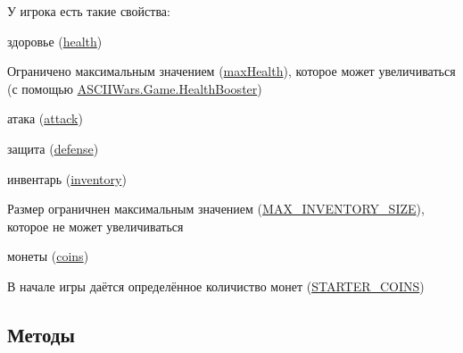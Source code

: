 У игрока есть такие свойства\+:
\begin{DoxyItemize}
\item здоровье (\hyperlink{class_a_s_c_i_i_wars_1_1_game_1_1_player_a8f364a47ef452b6c99bc13b7bdaae7ca}{health})
\begin{DoxyItemize}
\item Ограничено максимальным значением (\hyperlink{class_a_s_c_i_i_wars_1_1_game_1_1_player_acfd121f865f0e5a87f177e93c82feadc}{max\+Health}), которое может увеличиваться (с помощью \hyperlink{class_a_s_c_i_i_wars_1_1_game_1_1_health_booster}{A\+S\+C\+I\+I\+Wars.\+Game.\+Health\+Booster})
\end{DoxyItemize}
\item атака (\hyperlink{class_a_s_c_i_i_wars_1_1_game_1_1_player_a45736ed2f9941e3877df09db83cd4032}{attack})
\item защита (\hyperlink{class_a_s_c_i_i_wars_1_1_game_1_1_player_a1dc39c7d8054c42dcb7af70e78b3be02}{defense})
\item инвентарь (\hyperlink{class_a_s_c_i_i_wars_1_1_game_1_1_player_a04acfaa196162f89bfae7aee5ec45480}{inventory})
\begin{DoxyItemize}
\item Размер ограничнен максимальным значением (\hyperlink{class_a_s_c_i_i_wars_1_1_game_1_1_player_a1cc8a05398a717bcf8c5a0ebd2ea0747}{M\+A\+X\+\_\+\+I\+N\+V\+E\+N\+T\+O\+R\+Y\+\_\+\+S\+I\+ZE}), которое не может увеличиваться
\end{DoxyItemize}
\item монеты (\hyperlink{class_a_s_c_i_i_wars_1_1_game_1_1_player_a5abede19c5428143df924357ad475691}{coins})
\begin{DoxyItemize}
\item В начале игры даётся определённое количиство монет (\hyperlink{class_a_s_c_i_i_wars_1_1_game_1_1_player_af33b6af0d723918290a4a38aa4a6fb66}{S\+T\+A\+R\+T\+E\+R\+\_\+\+C\+O\+I\+NS}) 
\end{DoxyItemize}
\end{DoxyItemize}

\subsection{Методы}
\hypertarget{class_a_s_c_i_i_wars_1_1_game_1_1_player_a51054cd802e781a9f0a018f893ec3877}{}\label{class_a_s_c_i_i_wars_1_1_game_1_1_player_a51054cd802e781a9f0a018f893ec3877} 
